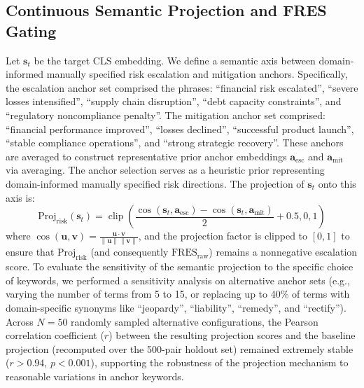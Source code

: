 \documentclass[journal]{IEEEtran}
\begin{document}
\subsection{Continuous Semantic Projection and FRES Gating}
Let $\mathbf{s}_t$ be the target CLS embedding. We define a semantic axis between domain-informed manually specified risk escalation and mitigation anchors. Specifically, the escalation anchor set comprised the phrases: ``financial risk escalated'', ``severe losses intensified'', ``supply chain disruption'', ``debt capacity constraints'', and ``regulatory noncompliance penalty''. The mitigation anchor set comprised: ``financial performance improved'', ``losses declined'', ``successful product launch'', ``stable compliance operations'', and ``strong strategic recovery''. These anchors are averaged to construct representative prior anchor embeddings $\mathbf{a}_{\text{esc}}$ and $\mathbf{a}_{\text{mit}}$ via averaging. The anchor selection serves as a heuristic prior representing domain-informed manually specified risk directions. The projection of $\mathbf{s}_t$ onto this axis is:
\begin{equation}
\label{eq:proj_risk}
\text{Proj}_{\text{risk}}(\mathbf{s}_t) = \operatorname{clip}\left(\frac{\cos(\mathbf{s}_t, \mathbf{a}_{\text{esc}}) - \cos(\mathbf{s}_t, \mathbf{a}_{\text{mit}})}{2} + 0.5, 0, 1\right)
\end{equation}
where $\cos(\mathbf{u}, \mathbf{v}) = \frac{\mathbf{u}\cdot\mathbf{v}}{\|\mathbf{u}\|\|\mathbf{v}\|}$, and the projection factor is clipped to $[0, 1]$ to ensure that $\text{Proj}_{\text{risk}}$ (and consequently $\text{FRES}_{\text{raw}}$) remains a nonnegative escalation score. To evaluate the sensitivity of the semantic projection to the specific choice of keywords, we performed a sensitivity analysis on alternative anchor sets (e.g., varying the number of terms from 5 to 15, or replacing up to 40\% of terms with domain-specific synonyms like ``jeopardy'', ``liability'', ``remedy'', and ``rectify''). Across $N=50$ randomly sampled alternative configurations, the Pearson correlation coefficient ($r$) between the resulting projection scores and the baseline projection (recomputed over the 500-pair holdout set) remained extremely stable ($r > 0.94$, $p < 0.001$), supporting the robustness of the projection mechanism to reasonable variations in anchor keywords.
\end{document}
